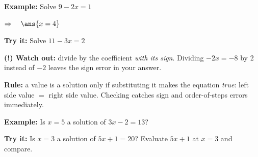 \documentclass[12pt]{article}
\begin{document}
\begin{examplebox}
\textbf{Example:} \quad Solve $9 - 2x = 1$

$\Rightarrow\quad \ans{x = 4}$
\end{examplebox}

\begin{tryitbox}
\textbf{Try it:} \quad Solve $11 - 3x = 2$\\[2pt]
\end{tryitbox}

\begin{watchoutbox}
\textbf{(!) Watch out:} divide by the coefficient \emph{with its sign}. Dividing
$-2x = -8$ by 2 instead of $-2$ leaves the sign error in your answer.
\end{watchoutbox}


\begin{formulabox}
\textbf{Rule:} a value is a solution only if substituting it makes the equation
\emph{true}: left side value $=$ right side value. Checking catches sign and
order-of-steps errors immediately.
\end{formulabox}

\begin{examplebox}
\textbf{Example:} \quad Is $x = 5$ a solution of $3x - 2 = 13$?
\end{examplebox}

\begin{tryitbox}
\textbf{Try it:} \quad Is $x = 3$ a solution of $5x + 1 = 20$? Evaluate $5x + 1$
at $x = 3$ and compare.\\[2pt]
\end{tryitbox}
\end{document}
